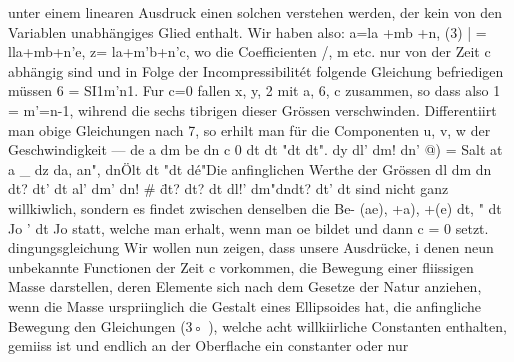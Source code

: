 \documentclass[11pt]{article}
\begin{document}
unter einem linearen Ausdruck einen solchen verstehen werden, der kein von den Variablen unabhängiges Glied enthalt. Wir haben also: a=la +mb +n, (3) | = lla+mb+n’e, z=
la+m’b+n’c, wo die Coeﬃcienten /, m etc. nur von der Zeit c abhängig sind und in Folge
der Incompressibilitét folgende Gleichung befriedigen müssen 6 = SI1m’n1.
Fur c=0 fallen x, y, 2 mit a, 6, c zusammen, so dass also 1 = m’=n-1, wihrend die sechs
tibrigen dieser Grössen verschwinden. Differentiirt man obige Gleichungen nach 7, so erhilt
man für die Componenten u, v, w der Geschwindigkeit — de a dm be dn c 0 dt dt "dt dt".
dy dl’ dm! dn’ @) = Salt at a \_ dz da, an", dnÖlt dt "dt dé"Die anfinglichen Werthe der
Grössen dl dm dn dt? dt’ dt al’ dm’ dn! \# d̈t? dt? dt dl!’ dm"dndt? dt’ dt sind nicht ganz
willkiwlich, sondern es findet zwischen denselben die Be- (ae), +a), +(e) dt, " dt Jo ’ dt
Jo statt, welche man erhalt, wenn man oe bildet und dann c = 0 setzt. dingungsgleichung
Wir wollen nun zeigen, dass unsere Ausdrücke, i denen neun unbekannte Functionen der
Zeit c vorkommen, die Bewegung einer fliissigen Masse darstellen, deren Elemente sich
nach dem Gesetze der Natur anziehen, wenn die Masse urspriinglich die Gestalt eines
Ellipsoides hat, die anfingliche Bewegung den Gleichungen (3◦ ), welche acht willkiirliche
Constanten enthalten, gemiiss ist und endlich an der Oberflache ein constanter oder nur
\end{document}
